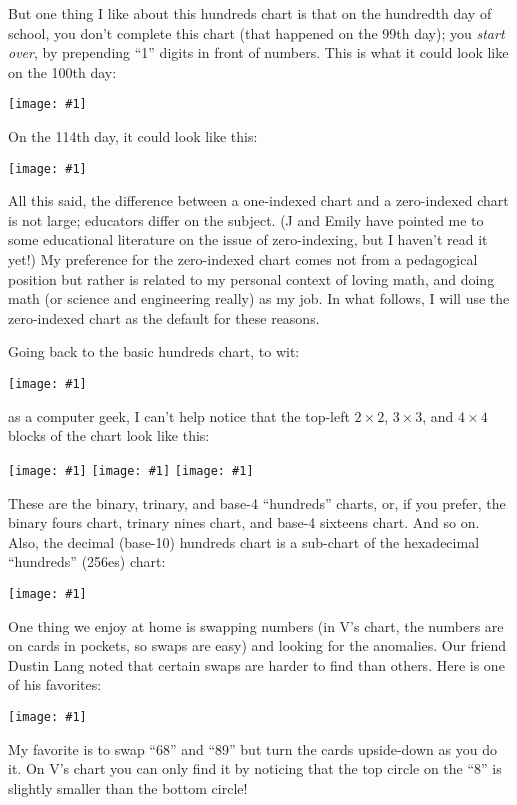 \documentclass[12pt,pdftex]{article}
\newcommand{\showchart}[1]{\texttt{[image: \#1]}}
\begin{document}
But one thing I like about this hundreds chart is that on the
hundredth day of school, you don't complete this chart (that happened
on the 99th day); you \emph{start over}, by prepending ``1'' digits in
front of numbers.  This is what it could look like on the 100th day:
\begin{center}
\showchart{hundreds_chart_day100.pdf}
\end{center}
On the 114th day, it could look like this:
\begin{center}
\showchart{hundreds_chart_day114.pdf}
\end{center}

All this said, the difference between a one-indexed chart and a
zero-indexed chart is not large; educators differ on the subject.  (J
and Emily have pointed me to some educational literature on the issue
of zero-indexing, but I haven't read it yet!)  My preference for the
zero-indexed chart comes not from a pedagogical position but rather is
related to my personal context of loving math, and doing math (or
science and engineering really) as my job.  In what follows, I will
use the zero-indexed chart as the default for these reasons.

Going back to the basic hundreds chart, to wit:
\begin{center}
\showchart{hundreds_chart_default.pdf}
\end{center}
as a computer geek, I can't help notice that the top-left $2\times 2$,
$3\times 3$, and $4\times 4$ blocks of the chart look like this:
\begin{center}
\showchart{hundreds_chart_2x2_base2.pdf}
\quad
\showchart{hundreds_chart_3x3_base3.pdf}
\quad
\showchart{hundreds_chart_4x4_base4.pdf}
\end{center}
These are the binary, trinary, and base-4 ``hundreds'' charts, or, if
you prefer, the binary fours chart, trinary nines chart, and base-4
sixteens chart.  And so on.  Also, the decimal (base-10) hundreds
chart is a sub-chart of the hexadecimal ``hundreds'' (256es) chart:
\begin{center}
\showchart{hundreds_chart_16x16_base16.pdf}
\end{center}

One thing we enjoy at home is swapping numbers (in V's chart, the
numbers are on cards in pockets, so swaps are easy) and looking for
the anomalies.  Our friend Dustin Lang noted that certain swaps are
harder to find than others.  Here is one of his favorites:
\begin{center}
\showchart{hundreds_chart_swap14.pdf}
\end{center}
My favorite is to swap ``68'' and ``89'' but turn the cards
upside-down as you do it.  On V's chart you can only find it by
noticing that the top circle on the ``8'' is slightly smaller than the
bottom circle!
\end{document}
